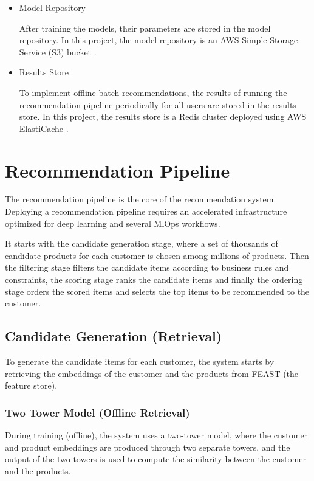 \begin{itemize}
    \item Model Repository
    \begin{displayquote}
        After training the models, their parameters are stored in the model repository. In this project, the model repository is an AWS Simple Storage Service (S3) bucket \cite{AwsS3}. 
    \end{displayquote}
    \item Results Store
    \begin{displayquote}
       To implement offline batch recommendations, the results of running the recommendation pipeline periodically for all users are stored in the results store. 
       In this project, the results store is a Redis cluster deployed using AWS ElastiCache \cite{AwsElastiCache}.
    \end{displayquote}
\end{itemize}

\section{Recommendation Pipeline}

The recommendation pipeline is the core of the recommendation system.
Deploying a recommendation pipeline requires an accelerated infrastructure optimized for deep learning and several MlOps workflows.

It starts with the candidate generation stage, where a set of thousands of candidate products for each customer is chosen among millions of products.
Then the filtering stage filters the candidate items according to business rules and constraints, the scoring stage ranks the candidate items and finally the ordering stage orders 
the scored items and selects the top items to be recommended to the customer.

\subsection{Candidate Generation (Retrieval)}

To generate the candidate items for each customer, the system starts by retrieving the embeddings of the customer and the products from FEAST (the feature store).

\subsubsection{Two Tower Model (Offline Retrieval)}

During training (offline), the system uses a two-tower model, where the customer and product embeddings are produced through two separate towers, 
and the output of the two towers is used to compute the similarity between the customer and the products.

